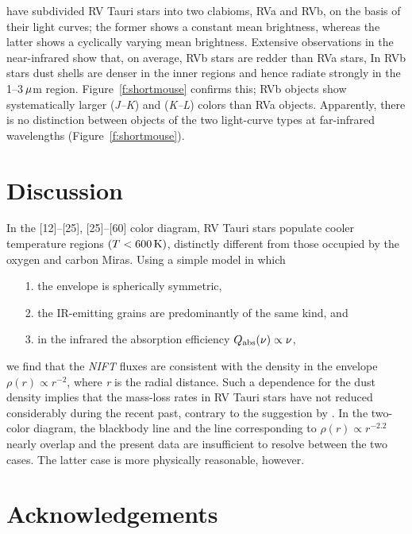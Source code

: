 \documentclass[useAMS,usenatbib]{biom}
\begin{document}
\citet{b13} have subdivided RV Tauri stars into two clabioms, RVa and
RVb, on the basis of their light curves; the former shows a constant
mean brightness, whereas the latter shows a cyclically varying mean
brightness. Extensive observations in the near-infrared show that, on
average, RVb stars are redder than RVa stars, In RVb stars dust shells
are denser in the inner regions and hence radiate strongly in the
1--3$\,\mu$m region. Figure~\ref{f:shortmouse} confirms this; RVb
objects show systematically larger ({\it J--K\/}) and ({\it K--L\/})
colors than RVa objects. Apparently, there is no distinction between
objects of the two light-curve types at far-infrared wavelengths
(Figure~\ref{f:shortmouse}).

\section{Discussion}
\label{s:discuss}

In the [12]--[25], [25]--[60] color diagram, RV Tauri stars populate
cooler temperature regions $(T<600 \,{\mathrm{K}})$, distinctly different from
those occupied by the oxygen and carbon Miras. Using a simple model
in which
\begin{enumerate}
  \item[1.] the envelope is spherically symmetric,
  \item[2.] the IR-emitting grains are predominantly of the same kind, and
  \item[3.] in the infrared the absorption efficiency $Q_{{\mathrm{abs}}}
        (\nu)\propto\nu$,
\end{enumerate}
we find that the {\it NIFT\/} fluxes are consistent with the
density in the envelope $\rho(r)\propto r^{-2}$, where {\it r\/}
is the radial distance. Such a dependence for the dust density
implies that the mass-loss rates in RV Tauri stars have not
reduced considerably during the recent past, contrary to the
suggestion by \citet{b12}. In the two-color diagram, the
blackbody line and the line corresponding to $\rho(r)\propto
r^{-2.2}$ nearly overlap and the present data are insufficient to
resolve between the two cases. The latter case is more physically
reasonable, however.

\backmatter


\section*{Acknowledgements}
\end{document}
